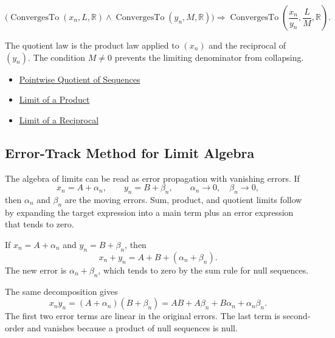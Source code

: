 \begin{remark*}
\[
\bigl(
\operatorname{ConvergesTo}(x_n,L,\mathbb{R})
\land
\operatorname{ConvergesTo}(y_n,M,\mathbb{R})
\bigr)
\Longrightarrow
\operatorname{ConvergesTo}\left(\frac{x_n}{y_n},\frac{L}{M},\mathbb{R}\right).
\]
\end{remark*}

\begin{remark*}[Interpretation]
The quotient law is the product law applied to $(x_n)$ and the reciprocal of
$(y_n)$. The condition $M\neq 0$ prevents the limiting denominator from
collapsing.
\end{remark*}

\begin{dependencies}
\begin{itemize}
  \item \hyperref[def:pointwise-quotient-sequence]{Pointwise Quotient of Sequences}
  \item \hyperref[thm:limit-of-a-product]{Limit of a Product}
  \item \hyperref[thm:limit-of-a-reciprocal]{Limit of a Reciprocal}
\end{itemize}
\end{dependencies}

\subsection*{Error-Track Method for Limit Algebra}
\label{subsec:error-track-method-limit-algebra}

\begin{exposition}
The algebra of limits can be read as error propagation with vanishing errors.
If
\[
  x_n=A+\alpha_n,\qquad y_n=B+\beta_n,
  \qquad \alpha_n\to 0,\quad \beta_n\to 0,
\]
then $\alpha_n$ and $\beta_n$ are the moving errors. Sum, product, and quotient
limits follow by expanding the target expression into a main term plus an
error expression that tends to zero.
\end{exposition}

\begin{example*}[Sum]
If $x_n=A+\alpha_n$ and $y_n=B+\beta_n$, then
\[
  x_n+y_n
  =
  A+B+(\alpha_n+\beta_n).
\]
The new error is $\alpha_n+\beta_n$, which tends to zero by the sum rule for
null sequences.
\end{example*}

\begin{example*}[Product]
The same decomposition gives
\[
  x_ny_n
  =
  (A+\alpha_n)(B+\beta_n)
  =
  AB+A\beta_n+B\alpha_n+\alpha_n\beta_n.
\]
The first two error terms are linear in the original errors. The last term is
second-order and vanishes because a product of null sequences is null.
\end{example*}

